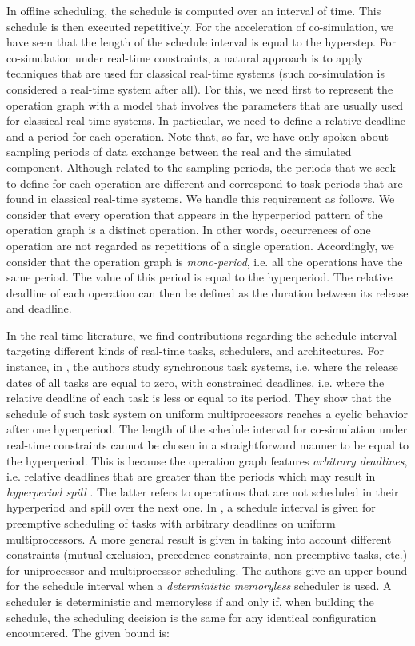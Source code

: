 In offline scheduling, the schedule is computed over an interval of time. This schedule is then executed repetitively. For the acceleration of co-simulation, we have seen that the length of the schedule interval is equal to the hyperstep. For co-simulation under real-time constraints, a natural approach is to apply techniques that are used for classical real-time systems (such co-simulation is considered a real-time system after all). For this, we need first to represent the operation graph with a model that involves the parameters that are usually used for classical real-time systems. In particular, we need to define a relative deadline and a period for each operation. Note that, so far, we have only spoken about sampling periods of data exchange between the real and the simulated component. Although related to the sampling periods, the periods that we seek to define for each operation are different and correspond to task periods that are found in classical real-time systems. We handle this requirement as follows. We consider that every operation that appears in the hyperperiod pattern of the operation graph is a distinct operation. In other words, occurrences of one operation are not regarded as repetitions of a single operation. Accordingly, we consider that the operation graph is \textit{mono-period}, i.e. all the operations have the same period. The value of this period is equal to the hyperperiod. The relative deadline of each operation can then be defined as the duration between its release and deadline.   

In the real-time literature, we find contributions regarding the schedule interval targeting different kinds of real-time tasks, schedulers, and architectures. For instance, in \cite{cucu:2006}, the authors study synchronous task systems, i.e. where the release dates of all tasks are equal to zero, with constrained deadlines, i.e. where the relative deadline of each task is less or equal to its period. They show that the schedule of such task system on uniform multiprocessors reaches a cyclic behavior after one hyperperiod. The length of the schedule interval for co-simulation under real-time constraints cannot be chosen in a straightforward manner to be equal to the hyperperiod. This is because the operation graph features \textit{arbitrary deadlines}, i.e. relative deadlines that are greater than the periods which may result in \textit{hyperperiod spill} \cite{dave:1999}. The latter refers to operations that are not scheduled in their hyperperiod and spill over the next one. In \cite{cucu:2007}, a schedule interval is given for preemptive scheduling of tasks with arbitrary deadlines on uniform multiprocessors. A more general result is given in \cite{grolleau:2013} taking into account different constraints (mutual exclusion, precedence constraints, non-preemptive tasks, etc.) for uniprocessor and multiprocessor scheduling. The authors give an upper bound for the schedule interval when a \textit{deterministic memoryless} scheduler is used. A scheduler is deterministic and memoryless if and only if, when building the schedule, the scheduling decision is the same for any identical configuration encountered. The given bound is:

